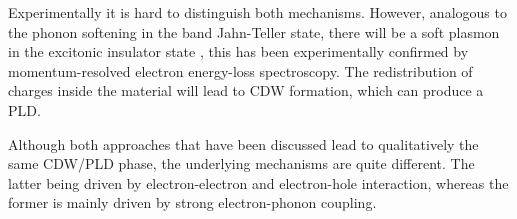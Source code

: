 Experimentally it is hard to distinguish both mechanisms.
However, analogous to the phonon softening in the band Jahn-Teller state, there will be a soft plasmon in the excitonic insulator state \cite{kohn1967, rossnagel2011}, this has been experimentally confirmed by momentum-resolved electron energy-loss spectroscopy\cite{kogar2017}.
The redistribution of charges inside the material will lead to \ac{CDW} formation, which can produce a \ac{PLD}.

Although both approaches that have been discussed lead to qualitatively the same \ac{CDW}/\ac{PLD} phase, the underlying mechanisms are quite different.
The latter being driven by electron-electron and electron-hole interaction, whereas the former is mainly driven by strong electron-phonon coupling.

